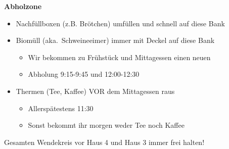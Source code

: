 \documentclass[24pt]{scrartcl}
\begin{document}
\vfill

\vfill
\begin{center}
\fontsize{40}{48}
\textbf{Abholzone}
\end{center}
\vfill
\begin{itemize}
\item Nachfüllboxen (z.B. Brötchen) umfüllen und schnell auf diese Bank
\item Biomüll (aka.\ Schweineeimer) immer mit Deckel auf diese Bank
\begin{itemize}
 \item Wir bekommen zu Frühstück und Mittagessen einen neuen
 \item Abholung 9:15-9:45 und 12:00-12:30
\end{itemize}
\item Thermen (Tee, Kaffee) VOR dem Mittagessen raus
\begin{itemize}
 \item Allerspätestens 11:30
 \item Sonst bekommt ihr morgen weder Tee noch Kaffee
\end{itemize}
\end{itemize}
\begin{center}
\end{center}
\vfill
\begin{center}

\end{center}
\vfill
\begin{center}
  Gesamten Wendekreis vor Haus 4 und Haus 3 immer frei halten!
\end{center}
\vfill
\end{document}
